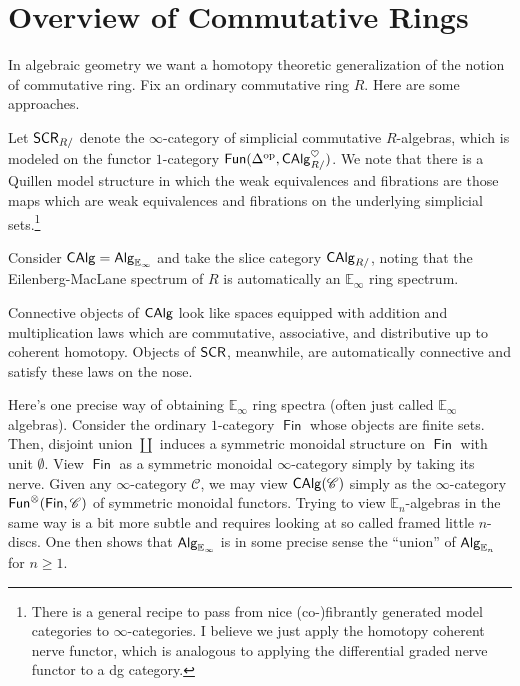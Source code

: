 \documentclass[11pt]{article}
\renewcommand{\C}{\mathscr{C}}
\newcommand{\E}{\mathbb{E}}
\DeclareMathOperator{\Fin}{\mathsf{Fin}} %
\begin{document}
\section{Overview of Commutative Rings}
In algebraic geometry we want a homotopy theoretic generalization of the notion of commutative ring. Fix an ordinary commutative ring $R$. Here are some approaches.
\begin{enum}{\arabic}
\item Let $\operatorname{\mathsf{SCR}}_{R/}$ denote the $\infty$-category of simplicial commutative $R$-algebras, which is modeled on the functor $1$-category $\operatorname{\mathsf{Fun}}(\Delta^{\operatorname{op}},\operatorname{\mathsf{CAlg}}_{R/}^{\heartsuit})$. We note that there is a Quillen model structure in which the weak equivalences and fibrations are those maps which are weak equivalences and fibrations on the underlying simplicial sets.\footnote{There is a general recipe to pass from nice (co-)fibrantly generated model categories to $\infty$-categories. I believe we just apply the homotopy coherent nerve functor, which is analogous to applying the differential graded nerve functor to a dg category.}

\item Consider $\CAlg=\Alg_{\E_{\infty}}$ and take the slice category $\operatorname{\mathsf{CAlg}}_{R/}$, noting that the Eilenberg-MacLane spectrum of $R$ is automatically an $\E_{\infty}$ ring spectrum.
\end{enum}

Connective objects of $\operatorname{\mathsf{CAlg}}$ look like spaces equipped with addition and multiplication laws which are commutative, associative, and distributive up to coherent homotopy. Objects of $\operatorname{\mathsf{SCR}}$, meanwhile, are automatically connective and satisfy these laws on the nose.

\begin{remark}
Here's one precise way of obtaining $\E_{\infty}$ ring spectra (often just called $\E_{\infty}$ algebras). Consider the ordinary $1$-category $\Fin$ whose objects are finite sets. Then, disjoint union $\coprod$ induces a symmetric monoidal structure on $\Fin$ with unit $\emptyset$. View $\Fin$ as a symmetric monoidal $\infty$-category simply by taking its nerve. Given any $\infty$-category $\C$, we may view $\CAlg(\C)$ simply as the $\infty$-category $\Fun^{\tensor}(\Fin,\C)$ of symmetric monoidal functors. Trying to view $\E_n$-algebras in the same way is a bit more subtle and requires looking at so called framed little $n$-discs. One then shows that $\Alg_{\E_{\infty}}$ is in some precise sense the ``union'' of $\Alg_{\E_n}$ for $n\geq1$.
\end{remark}
\end{document}
